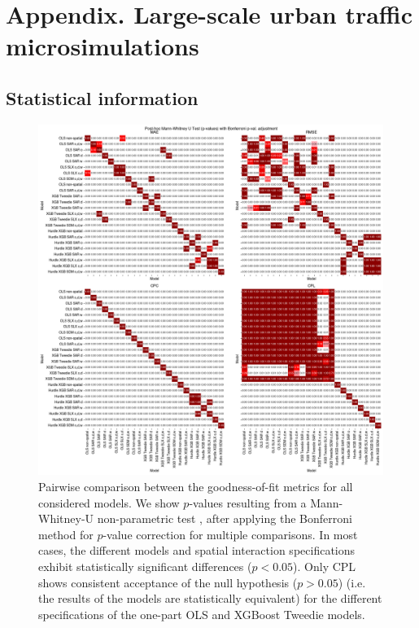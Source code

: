 \chapter{Appendix. Large-scale urban traffic microsimulations}
\label{ch:appendix_getting_real}

\graphicspath{{chapters/appendix_ETRCO2H/figures}}

\section{Statistical information}
\label{sec:appendix}


\begin{figure}[ht!]
    \centering
    \includegraphics[width=1\textwidth]{fig_MWU_results_models_Bonf_n1000_r.png}
    \caption{Pairwise comparison between the goodness-of-fit metrics for all considered models. We show $p$-values  resulting from a Mann-Whitney-U non-parametric test \citep{Mann1947}, after applying the Bonferroni method for $p$-value correction for multiple comparisons. In most cases, the different models and spatial interaction specifications exhibit statistically significant differences ($p<0.05$). Only CPL shows consistent acceptance of the null hypothesis ($p>0.05$) (i.e. the results of the models are statistically equivalent) for the different specifications of the one-part OLS and XGBoost Tweedie models.}
    \label{fig:MWU_test_2x2_pvalues}
\end{figure}


